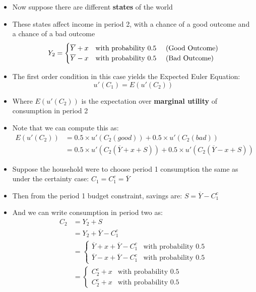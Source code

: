 \documentclass{article}
\numberwithin{equation}{section}
\numberwithin{figure}{section}
\begin{document}
	\begin{itemize}
		\item Now suppose there are different \textbf{states} of the world
		\item These states affect income in period 2, with a chance of a good outcome and a chance of a bad outcome
		\[	
			Y_2= 
			\begin{cases}
				\overline{Y} + x & \text{with probability 0.5 \quad (Good Outcome)} \\
				\overline{Y} - x & \text{with probability 0.5 \quad (Bad Outcome)}
			\end{cases}
		\]
		\item The first order condition in this case yields the \textcolor{myblue}{Expected Euler Equation:}
		\[
			u'(C_1) = E(u'(C_2))
		\]
		\item Where \( E(u'(C_2)) \) is the expectation over \textbf{marginal utility} of consumption in period 2
		\item Note that we can compute this as:
		\begin{align*}
			E(u'(C_2)) &= 0.5 \times u'(C_2(good)) + 0.5 \times u'(C_2(bad)) \\
			&= 0.5 \times u'(C_2(\overline{Y} + x + S)) + 0.5 \times u'(C_2(\overline{Y} - x + S))
		\end{align*}
		\item Suppose the household were to choose period 1 consumption the same as under the certainty case: \( C_1 = C_1^c = \overline{Y} \)
		\item Then from the period 1 budget constraint, savings are: \( S = \overline{Y} - C_1^c \)
		\item And we can write consumption in period two as:
		\begin{align*}
			C_2 &= Y_2 + S \\
			&= Y_2 + \overline{Y} - C_1^c \\
			&=
			\begin{cases}
				\overline{Y} + x + \overline{Y} - C_1^c & \text{with probability 0.5} \\
				\overline{Y} - x + \overline{Y} - C_1^c & \text{with probability 0.5}
			\end{cases}
			\\
			&=
			\begin{cases}
				C_2^c + x & \text{with probability 0.5} \\
				C_2^c + x & \text{with probability 0.5}
			\end{cases}
		\end{align*}

\end{itemize}
\end{document}
